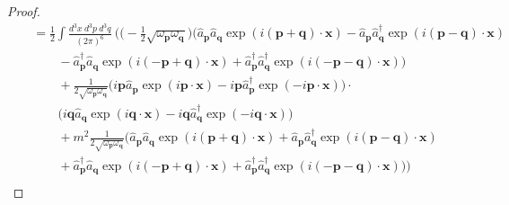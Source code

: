 \begin{proof}
\begin{equation*}
\begin{aligned}
            \phantom{\hat H} & = \frac{1}{2} \int \frac{d^3 x ~ d^3 p ~d^3 q}{(2\pi)^6} ~ \Big (\Big (- \frac{1}{2} \sqrt{\omega_{\mathbf p} \omega_{\mathbf q}} \Big ) \Big (\hat a_{\mathbf p} \hat a_{\mathbf q} \exp(i (\mathbf p + \mathbf q) \cdot \mathbf x) - \hat a_{\mathbf p} \hat a_{\mathbf q}^\dagger \exp(i (\mathbf p - \mathbf q) \cdot \mathbf x) \\ & \qquad - \hat a_{\mathbf p}^\dagger \hat a_{\mathbf q} \exp(i (- \mathbf p + \mathbf q) \cdot \mathbf x) + \hat a_{\mathbf p}^\dagger \hat a_{\mathbf q}^\dagger \exp(i (- \mathbf p - \mathbf q) \cdot \mathbf x) \Big) \\ & \qquad + \frac{1}{2 \sqrt{\omega_{\mathbf p} \omega_{\mathbf q}}} \Big (i \mathbf p \hat a_{\mathbf p} \exp(i \mathbf p \cdot \mathbf x) - i \mathbf p \hat a_{\mathbf p}^\dagger \exp(- i \mathbf p \cdot \mathbf x) \Big) \cdot \\ & \qquad \Big ( i \mathbf q \hat a_{\mathbf q} \exp(i \mathbf q \cdot \mathbf x) - i \mathbf q \hat a_{\mathbf q}^\dagger \exp(- i \mathbf q \cdot \mathbf x) \Big) \\ & \qquad + m^2 \frac{1}{2 \sqrt{\omega_{\mathbf p} \omega_{\mathbf q}}} \Big (\hat a_{\mathbf p} \hat a_{\mathbf q} \exp(i (\mathbf p + \mathbf q) \cdot \mathbf x) + \hat a_{\mathbf p} \hat a_{\mathbf q}^\dagger \exp(i (\mathbf p - \mathbf q) \cdot \mathbf x) \\ & \qquad + \hat a_{\mathbf p}^\dagger \hat a_{\mathbf q} \exp(i (- \mathbf p + \mathbf q) \cdot \mathbf x) + \hat a_{\mathbf p}^\dagger \hat a_{\mathbf q}^\dagger \exp(i (- \mathbf p - \mathbf q) \cdot \mathbf x) \Big) \Big) 
        \end{aligned}
        \end{equation*}
        \begin{equation*}
        \begin{aligned}

\end{aligned}
\end{equation*}
\end{proof}

